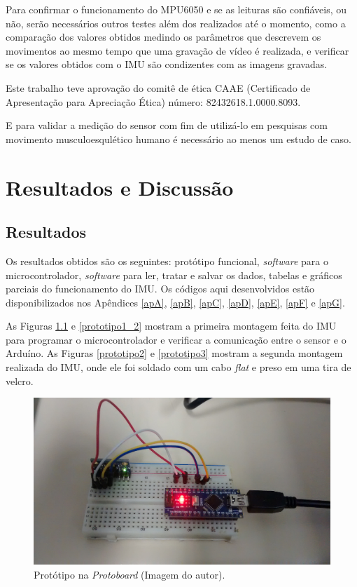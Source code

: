 	Para confirmar o funcionamento do MPU6050  e se as leituras são confiáveis, ou não, serão necessários outros testes além dos realizados até o momento, como a comparação dos valores obtidos medindo os parâmetros que descrevem os movimentos ao mesmo tempo que uma gravação de vídeo é realizada, e verificar se os valores obtidos com o IMU são condizentes com as imagens gravadas. 
	
	Este trabalho teve aprovação do comitê de ética CAAE (Certificado de Apresentação para Apreciação Ética) número: 82432618.1.0000.8093. 
	
	
	E para validar a medição do sensor com fim de  utilizá-lo em pesquisas com movimento musculoesqulético humano é necessário ao menos um estudo de caso.
	
\chapter{Resultados e Discussão}
	\section{Resultados}
	
	
	Os resultados obtidos são os seguintes: protótipo funcional, \textit{software} para o microcontrolador, \textit{software} para ler, tratar e salvar os dados, tabelas e gráficos parciais do funcionamento do IMU. Os códigos aqui desenvolvidos estão disponibilizados nos Apêndices \ref{apA}, \ref{apB}, \ref{apC}, \ref{apD}, \ref{apE}, \ref{apF} e \ref{apG}.
	
	
	As Figuras \ref{prototipo1} e \ref{prototipo1_2} mostram a primeira montagem feita do IMU para programar o microcontrolador e verificar a comunicação entre o sensor e o Arduíno. As Figuras \ref{prototipo2} e \ref{prototipo3} mostram a segunda montagem realizada do IMU, onde ele foi soldado com um cabo \textit{flat} e preso em uma tira de velcro.
	
	\begin{figure}[h!]
		\centering
		\includegraphics[keepaspectratio=true,scale=0.12]{figuras/prototipo1.jpg}
		\caption{Protótipo na \textit{Protoboard} (Imagem do autor).}

		\label{prototipo1}	
	\end{figure}
	 
